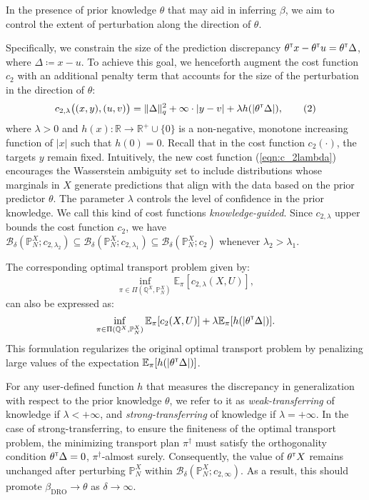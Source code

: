 \documentclass[12pt]{article}
\begin{document}
In the presence of prior knowledge $\theta$ that may aid in inferring $\beta$, we aim to control the extent of perturbation along the direction of $\theta$. 

Specifically, we constrain the size of the prediction discrepancy $\theta^{\scriptscriptstyle \sf T} x - \theta^{\scriptscriptstyle \sf T} u = \theta^{\scriptscriptstyle \sf T} \Delta$, where $\Delta \coloneqq x - u$.  
To achieve this goal, we henceforth augment the cost function $c_2$ with an additional penalty term that accounts for the size of the perturbation in the direction of $\theta$:
\begin{align*}
    c_{2,\lambda}\big((x,y),(u,v)\big) 
    = \|\Delta\|_q^2 + \infty \cdot |y - v| + \lambda h(|\theta^{\scriptscriptstyle \sf T} \Delta|),
    \label{eqn:c_2lambda} \tag{2}
\end{align*}
where $\lambda > 0$ and $h(x): \mathbb{R} \to \mathbb{R}^+ \cup \{0\}$ is a non-negative, monotone increasing function of $|x|$ such that $h(0) = 0$. Recall that in the cost function $c_2(\cdot)$, the targets $y$ remain fixed. Intuitively, the new cost function (\ref{eqn:c_2lambda})  encourages the Wasserstein ambiguity set to include distributions whose marginals in 
$X$ generate predictions that align with the data based on the prior predictor $\theta$. The parameter $\lambda$ controls the level of confidence in the prior knowledge. We call this kind of cost functions \textit{knowledge-guided}. Since $c_{2,\lambda}$ upper bounds the cost function $c_2$, we have $\mathcal{B}_\delta(\mathbb{P}^X_N;c_{2,\lambda_2}) \subseteq\mathcal{B}_\delta(\mathbb{P}^X_N;c_{2,\lambda_1})  \subseteq\mathcal{B}_\delta(\mathbb{P}^X_N;c_{2})$ whenever $\lambda_2>\lambda_1$.

The corresponding optimal transport problem given by:
\[
\inf_{\pi \in \Pi(\mathbb{Q}^X, \mathbb{P}_N^X)} \mathbb{E}_\pi [c_{2,\lambda}(X, U)],
\]
can also be expressed as:
\[
\inf_{\pi \in \Pi(\mathbb{Q}^X, \mathbb{P}_N^X)} \mathbb{E}_\pi [c_2(X, U)] + \lambda \mathbb{E}_\pi [h(|\theta^{\scriptscriptstyle \sf T} \Delta|)].
\]
This formulation regularizes the original optimal transport problem by penalizing large values of the expectation $\mathbb{E}_\pi [h(|\theta^{\scriptscriptstyle \sf T} \Delta|)]$.

For any user-defined function \( h \) that measures the discrepancy in generalization with respect to the prior knowledge \( \theta \), we refer to it as \textit{weak-transferring} of knowledge if \(\lambda < +\infty\), and \textit{strong-transferring} of knowledge if \(\lambda = +\infty\). In the case of strong-transferring, to ensure the finiteness of the optimal transport problem, the minimizing transport plan \(\pi^\dagger\) must satisfy the orthogonality condition \(\theta^{\scriptscriptstyle \sf T} \Delta = 0\), \(\pi^\dagger\)-almost surely. Consequently, the value of \(\theta^{\scriptscriptstyle \sf T} X\) remains unchanged after perturbing \(\mathbb{P}_N^X\) within \(\mathcal{B}_\delta(\mathbb{P}_N^X; c_{2,\infty})\). As a result, this should promote $\beta_{\mathrm{DRO}} \to \theta$ as $\delta \to \infty$.
\end{document}
